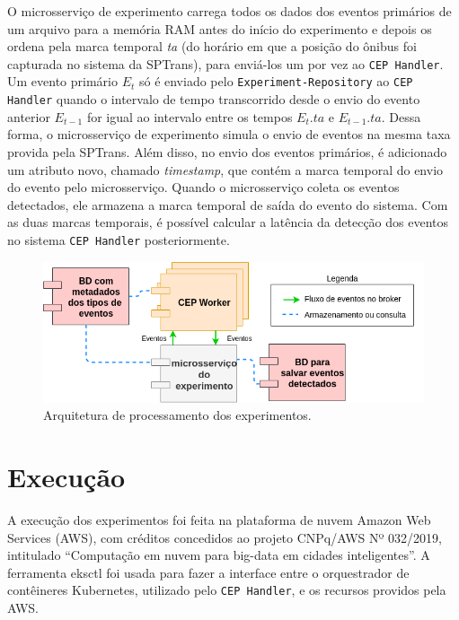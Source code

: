 O microsserviço de experimento carrega todos os dados dos eventos primários de um arquivo para a memória RAM antes do início do experimento e depois os ordena pela marca temporal \textit{ta} (do horário em que a posição do ônibus foi capturada no sistema da SPTrans), para enviá-los um por vez ao \texttt{CEP Handler}. Um evento primário $E_t$ só é enviado pelo \texttt{Experiment-Repository} ao \texttt{CEP Handler} quando o intervalo de tempo transcorrido desde o envio do evento anterior $E_{t-1}$ for igual ao intervalo entre os tempos $E_t.ta$ e $E_{t-1}.ta$. 
Dessa forma, o microsserviço de experimento simula o envio de eventos na mesma taxa provida pela SPTrans. 
Além disso, no envio dos eventos primários, é adicionado um atributo novo, chamado \textit{timestamp}, que contém a marca temporal do envio do evento pelo microsserviço. Quando o microsserviço coleta os eventos detectados, ele armazena a marca temporal de saída do evento do sistema. Com as duas marcas temporais, é possível calcular a latência da detecção dos eventos no sistema \texttt{CEP Handler} posteriormente.  



\begin{figure}[tb]
\centering
\includegraphics[width=\textwidth]{figuras/arquiteturaexp.png}
\caption{Arquitetura de processamento dos experimentos.}
\label{fig:experiment_arch_diagram}
\end{figure}

\section{Execução} 
A execução dos experimentos foi feita na plataforma de nuvem Amazon Web Services (AWS), com créditos concedidos ao projeto CNPq/AWS Nº 032/2019, intitulado ``Computação em nuvem para big-data em cidades inteligentes''.
A ferramenta eksctl \citep{EKSCTL} foi usada para fazer a interface entre o orquestrador de contêineres Kubernetes, utilizado pelo \texttt{CEP Handler}, e os recursos providos pela AWS.

